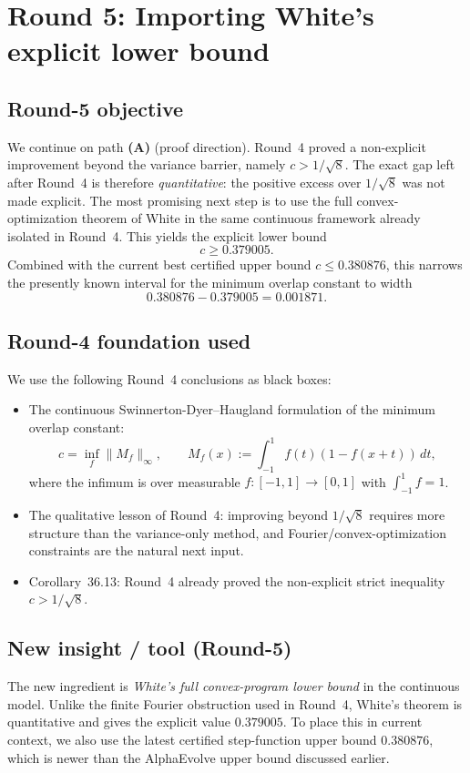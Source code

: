 \section{Round 5: Importing White's explicit lower bound}

\subsection{Round-5 objective}
We continue on path \textbf{(A)} (proof direction).
Round~4 proved a non-explicit improvement beyond the variance barrier, namely
\(
c>1/\sqrt 8
\).
The exact gap left after Round~4 is therefore \emph{quantitative}: the positive excess over
\(1/\sqrt 8\) was not made explicit.
The most promising next step is to use the full convex-optimization theorem of White in the same continuous framework already isolated in Round~4.
This yields the explicit lower bound
\[
 c\ge 0.379005.
\]
Combined with the current best certified upper bound
\(
c\le 0.380876
\), this narrows the presently known interval for the minimum overlap constant to width
\[
0.380876-0.379005=0.001871.
\]

\subsection{Round-4 foundation used}
We use the following Round~4 conclusions as black boxes:
\begin{itemize}
\item The continuous Swinnerton-Dyer--Haugland formulation of the minimum overlap constant:
\[
 c=
 \inf_f \|M_f\|_\infty,
 \qquad
 M_f(x):=\int_{-1}^{1} f(t)(1-f(x+t))\,dt,
\]
where the infimum is over measurable \(f:[-1,1]\to[0,1]\) with \(\int_{-1}^{1}f=1\).
\item The qualitative lesson of Round~4: improving beyond \(1/\sqrt 8\) requires more structure than the variance-only method, and Fourier/convex-optimization constraints are the natural next input.
\item Corollary~36.13: Round~4 already proved the non-explicit strict inequality \(c>1/\sqrt 8\).
\end{itemize}

\subsection{New insight / tool (Round-5)}
The new ingredient is \emph{White's full convex-program lower bound} in the continuous model.
Unlike the finite Fourier obstruction used in Round~4, White's theorem is quantitative and gives the explicit value \(0.379005\).
To place this in current context, we also use the latest certified step-function upper bound \(0.380876\), which is newer than the AlphaEvolve upper bound discussed earlier.

